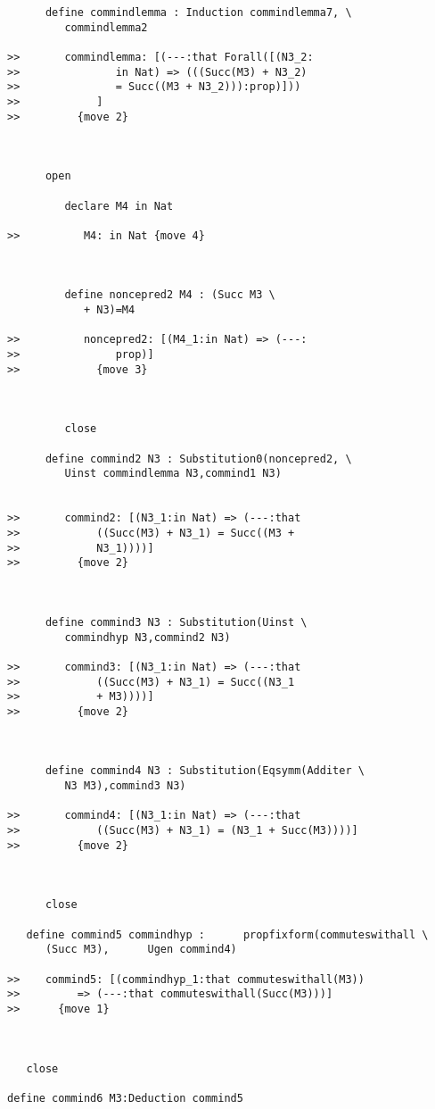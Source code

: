 \documentclass[12pt]{article}
\begin{document}
\begin{verbatim}
      define commindlemma : Induction commindlemma7, \
         commindlemma2

>>       commindlemma: [(---:that Forall([(N3_2:
>>               in Nat) => (((Succ(M3) + N3_2)
>>               = Succ((M3 + N3_2))):prop)]))
>>            ]
>>         {move 2}



      open

         declare M4 in Nat

>>          M4: in Nat {move 4}



         define noncepred2 M4 : (Succ M3 \
            + N3)=M4

>>          noncepred2: [(M4_1:in Nat) => (---:
>>               prop)]
>>            {move 3}



         close

      define commind2 N3 : Substitution0(noncepred2, \
         Uinst commindlemma N3,commind1 N3)


>>       commind2: [(N3_1:in Nat) => (---:that
>>            ((Succ(M3) + N3_1) = Succ((M3 +
>>            N3_1))))]
>>         {move 2}



      define commind3 N3 : Substitution(Uinst \
         commindhyp N3,commind2 N3)

>>       commind3: [(N3_1:in Nat) => (---:that
>>            ((Succ(M3) + N3_1) = Succ((N3_1
>>            + M3))))]
>>         {move 2}



      define commind4 N3 : Substitution(Eqsymm(Additer \
         N3 M3),commind3 N3)

>>       commind4: [(N3_1:in Nat) => (---:that
>>            ((Succ(M3) + N3_1) = (N3_1 + Succ(M3))))]
>>         {move 2}



      close

   define commind5 commindhyp :      propfixform(commuteswithall \
      (Succ M3),      Ugen commind4)

>>    commind5: [(commindhyp_1:that commuteswithall(M3))
>>         => (---:that commuteswithall(Succ(M3)))]
>>      {move 1}



   close

define commind6 M3:Deduction commind5


\end{verbatim}
\end{document}
